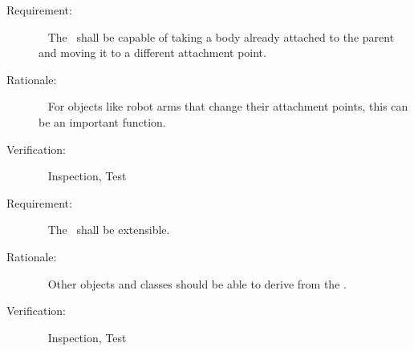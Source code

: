 \label{reqt:mass_reattach}
\begin{description}
   \item[Requirement:]\ \newline
     The \ModelDesc\ shall be capable of taking a body already attached to
     the parent and moving it to a different attachment point.
  \item[Rationale:]\ \newline
     For objects like robot arms that change their attachment points, this
     can be an important function.
  \item[Verification:]\ \newline
    Inspection, Test
\end{description}

\label{reqt:mass_extend}
  \begin{description}
    \item[Requirement:]\ \newline
    The \ModelDesc\ shall be extensible.
    \item[Rationale:]\ \newline
    Other objects and classes should be able to derive from the \ModelDesc.
    \item[Verification:]\ \newline
    Inspection, Test
\end{description}
